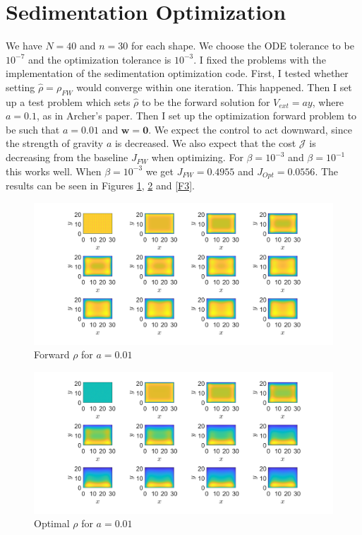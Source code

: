 \documentclass[11pt, a4paper]{article}
\theoremstyle{definition}
\newcommand{\w}{\mathbf{w}}
\newcommand{\hr}{\widehat \rho}
\begin{document}
	\section{Sedimentation Optimization}
	We have $N = 40$ and $n = 30$ for each shape. We choose the ODE tolerance to be $10^{-7}$ and the optimization tolerance is $10^{-3}$.
	I fixed the problems with the implementation of the sedimentation optimization code. First, I tested whether setting $\hr = \rho_{FW}$ would converge within one iteration. This happened. 
	Then I set up a test problem which sets $\hr$ to be the forward solution for $V_{ext} = ay$, where $a = 0.1$, as in Archer's paper. Then I set up the optimization forward problem to be such that $a = 0.01$ and $\w = \mathbf 0$. We expect the control to act downward, since the strength of gravity $a$ is decreased.
	We also expect that the cost $\mathcal J$ is decreasing from the baseline $J_{FW}$ when optimizing.
	For $\beta = 10^{-3}$ and $\beta = 10^{-1}$ this works well.
	When $\beta = 10^{-3}$ we get $J_{FW} = 0.4955$ and $J_{Opt} = 0.0556 $. 
	The results can be seen in Figures \ref{F1}, \ref{F2} and \ref{F3}.
	\begin{figure}[h]
		\centering
		\includegraphics[scale=0.35]{F1.png}
		\caption{Forward $\rho$ for $a = 0.01$} 
		\label{F1}
	\end{figure}	
	\begin{figure}[h]
		\centering
		\includegraphics[scale=0.35]{F2.png}
		\caption{Optimal $\rho$ for $a = 0.01$} 
		\label{F2}
	\end{figure}
\end{document}

